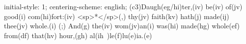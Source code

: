 initial-style: 1;
centering-scheme: english;
(c3)Daugh(eg/hi)ter,(iv) be(iv) of(jv) good(i) com(hi)fort:(iv) <sp>*</sp>(,) thy(jv) faith(kv) hath(j) made(ij) thee(jv) whole.(i) (;) And(g) the(iv) wom(jv)an(i) was(hi) made(hg) whole(ef) from(df) that(hv) hour,(gh) al(ih~)le(f)lu(e)ia.(e)
